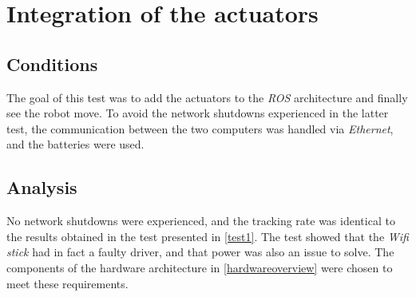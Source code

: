 	\section{Integration of the actuators}\label{test3}
		
		\subsection{Conditions}
		
		The goal of this test was to add the actuators 
		to the \textit{ROS} architecture and finally 
		see the robot move. To avoid the network shutdowns 
		experienced in the latter test, the communication
		between the two computers
		was handled via \textit{Ethernet}, and the batteries
		were used. 
		
		\subsection{Analysis}
		
		No network shutdowns were experienced, and 
		the tracking rate was identical to
		the results obtained in the test 
		presented in \vref{test1}. The test 
		showed that the \textit{Wifi stick}
		had in fact a faulty driver, and that 
		power was also an issue to solve.
		The components of the hardware architecture in \vref{hardwareoverview} were chosen
		to meet these requirements.
		
		\FloatBarrier
		
